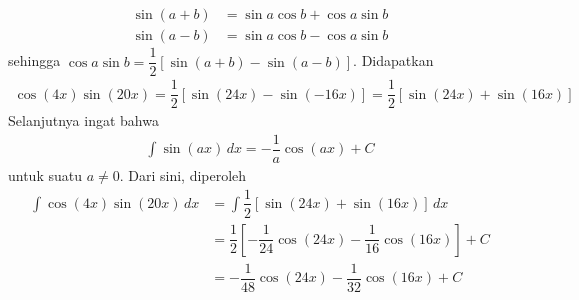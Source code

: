 \documentclass{article}
\begin{document}
\begin{enumerate}
\begin{align*}
\sin (a+b) &= \sin a\cos b+\cos a\sin b\\
\sin(a-b) &= \sin a\cos b -\cos a\sin b
\end{align*}
sehingga $\cos a \sin b = \dfrac{1}{2}[\sin (a+b)-\sin(a-b)]$. Didapatkan 
\begin{align*}
\cos (4x)\sin (20x) = \dfrac{1}{2}[\sin (24x) - \sin (-16x)] = \dfrac{1}{2}[\sin (24x) +\sin (16x)]
\end{align*}
Selanjutnya ingat bahwa 
\begin{align*}
\int \sin (ax) \, dx = -\dfrac{1}{a}\cos (ax) + C
\end{align*}
untuk suatu $a\neq 0$. Dari sini, diperoleh 
\begin{align*}
\int \cos (4x)\sin (20x)\, dx &= \int \dfrac{1}{2}[\sin (24x) +\sin (16x)]\, dx \\
&= \dfrac{1}{2}\left[ -\dfrac{1}{24}\cos (24x) - \dfrac{1}{16}\cos (16x)\right] + C\\
&= -\dfrac{1}{48}\cos (24x) - \dfrac{1}{32} \cos (16x) + C
\end{align*}
\end{enumerate}
\end{document}
